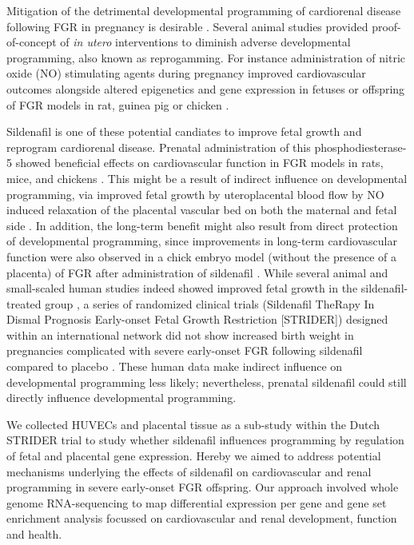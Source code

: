 \documentclass[authordate, empirical]{jote-new-article}
\begin{document}
Mitigation of the detrimental developmental programming of cardiorenal disease following FGR in pregnancy is desirable \parencites{Paauw2016}. Several animal studies provided proof-of-concept of \emph{in utero }interventions to diminish adverse developmental programming, also known as reprogamming. For instance administration of nitric oxide (NO) stimulating agents during pregnancy improved cardiovascular outcomes alongside altered epigenetics and gene expression in fetuses or offspring of FGR models in rat, guinea pig or chicken \parencites{Herrera2017}{Itani2017}{Man2020}{Wu2015}.



Sildenafil is one of these potential candiates to improve fetal growth and reprogram cardiorenal disease. Prenatal administration of this phosphodiesterase-5 showed beneficial effects on cardiovascular function in FGR models in rats, mice, and chickens \parencites{Itani2017}{Mills2018}{Terstappen2019}. This might be a result of indirect influence on developmental programming, via improved fetal growth by uteroplacental blood flow by NO induced relaxation of the placental vascular bed on both the maternal and fetal side \parencites{Krause2011}{Wareing2006}. In addition, the long-term benefit might also result from direct protection of developmental programming, since improvements in long-term cardiovascular function were also observed in a chick embryo model (without the presence of a placenta) of FGR after administration of sildenafil \parencites{Itani2017}. While several animal and small-scaled human studies indeed showed improved fetal growth in the sildenafil-treated group \parencites{Paauw2017}{VonDadelszen2011}, a series of randomized clinical trials (Sildenafil TheRapy In Dismal Prognosis Early-onset Fetal Growth Restriction [STRIDER]) designed within an international network did not show increased birth weight in pregnancies complicated with severe early-onset FGR following sildenafil compared to placebo \parencites{Pels2020}{Sharp2018}{Groom2019}. These human data make indirect influence on developmental programming less likely; nevertheless, prenatal sildenafil could still directly influence developmental programming.



We collected HUVECs and placental tissue as a sub-study within the Dutch STRIDER trial to study whether sildenafil influences programming by regulation of fetal and placental gene expression. Hereby we aimed to address potential mechanisms underlying the effects of sildenafil on cardiovascular and renal programming in severe early-onset FGR offspring. Our approach involved whole genome RNA-sequencing to map differential expression per gene and gene set enrichment analysis focussed on cardiovascular and renal development, function and health.
\end{document}

